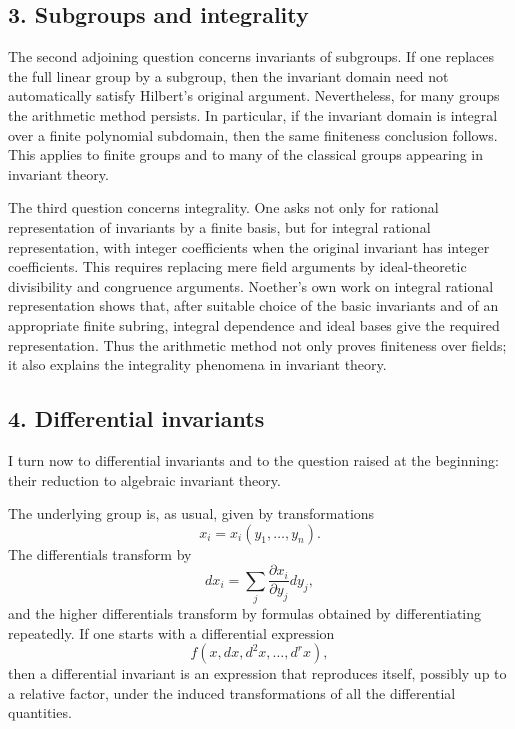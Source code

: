\documentclass[11pt]{article}
\begin{document}
\subsection{3. Subgroups and integrality}

The second adjoining question concerns invariants of subgroups. If one replaces the full linear group by a subgroup, then the invariant domain need not automatically satisfy Hilbert's original argument. Nevertheless, for many groups the arithmetic method persists. In particular, if the invariant domain is integral over a finite polynomial subdomain, then the same finiteness conclusion follows. This applies to finite groups and to many of the classical groups appearing in invariant theory.

The third question concerns integrality. One asks not only for rational representation of invariants by a finite basis, but for integral rational representation, with integer coefficients when the original invariant has integer coefficients. This requires replacing mere field arguments by ideal-theoretic divisibility and congruence arguments. Noether's own work on integral rational representation shows that, after suitable choice of the basic invariants and of an appropriate finite subring, integral dependence and ideal bases give the required representation. Thus the arithmetic method not only proves finiteness over fields; it also explains the integrality phenomena in invariant theory.

\subsection{4. Differential invariants}

I turn now to differential invariants and to the question raised at the beginning: their reduction to algebraic invariant theory.

The underlying group is, as usual, given by transformations
\begin{equation}
  x_i=x_i(y_1,\ldots,y_n).                                       \tag{4}
\end{equation}
The differentials transform by
\[
  dx_i=\sum_j \frac{\partial x_i}{\partial y_j}dy_j,
\]
and the higher differentials transform by formulas obtained by differentiating repeatedly. If one starts with a differential expression
\[
  f(x,dx,d^2x,\ldots,d^rx),
\]
then a differential invariant is an expression that reproduces itself, possibly up to a relative factor, under the induced transformations of all the differential quantities.
\end{document}
